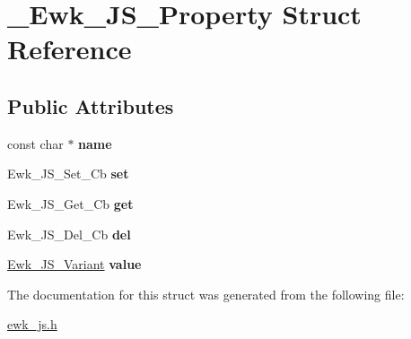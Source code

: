 \hypertarget{struct__Ewk__JS__Property}{\section{\+\_\+\+Ewk\+\_\+\+J\+S\+\_\+\+Property Struct Reference}
\label{struct__Ewk__JS__Property}
}
\subsection*{Public Attributes}
\begin{DoxyCompactItemize}
\item 
\hypertarget{struct__Ewk__JS__Property_a60459eff074b606d009a73542721355e}{const char $\ast$ {\bfseries name}}\label{struct__Ewk__JS__Property_a60459eff074b606d009a73542721355e}

\item 
\hypertarget{struct__Ewk__JS__Property_a59e58395903b472dfd73a2ecec680180}{Ewk\+\_\+\+J\+S\+\_\+\+Set\+\_\+\+Cb {\bfseries set}}\label{struct__Ewk__JS__Property_a59e58395903b472dfd73a2ecec680180}

\item 
\hypertarget{struct__Ewk__JS__Property_a00238d9a1e52cb43666e5808eeee9455}{Ewk\+\_\+\+J\+S\+\_\+\+Get\+\_\+\+Cb {\bfseries get}}\label{struct__Ewk__JS__Property_a00238d9a1e52cb43666e5808eeee9455}

\item 
\hypertarget{struct__Ewk__JS__Property_aa28eff06b5b4e5afe2fe98eead5421d3}{Ewk\+\_\+\+J\+S\+\_\+\+Del\+\_\+\+Cb {\bfseries del}}\label{struct__Ewk__JS__Property_aa28eff06b5b4e5afe2fe98eead5421d3}

\item 
\hypertarget{struct__Ewk__JS__Property_aaba8e34e4e4ea817934e54b03aec5954}{\hyperlink{struct__Ewk__JS__Variant}{Ewk\+\_\+\+J\+S\+\_\+\+Variant} {\bfseries value}}\label{struct__Ewk__JS__Property_aaba8e34e4e4ea817934e54b03aec5954}

\end{DoxyCompactItemize}


The documentation for this struct was generated from the following file\+:\begin{DoxyCompactItemize}
\item 
\hyperlink{ewk__js_8h}{ewk\+\_\+js.\+h}\end{DoxyCompactItemize}
